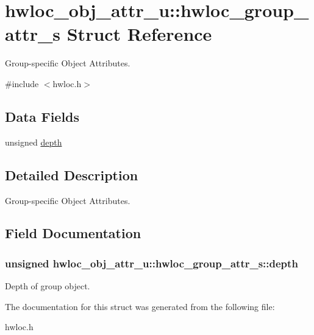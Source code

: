 \hypertarget{a00015}{
\section{hwloc\_\-obj\_\-attr\_\-u::hwloc\_\-group\_\-attr\_\-s Struct Reference}
\label{a00015}
}


Group-\/specific Object Attributes.  




{\ttfamily \#include $<$hwloc.h$>$}

\subsection*{Data Fields}
\begin{DoxyCompactItemize}
\item 
unsigned \hyperlink{a00015_ad914eac61c77481e1b7037877bcc5579}{depth}
\end{DoxyCompactItemize}


\subsection{Detailed Description}
Group-\/specific Object Attributes. 

\subsection{Field Documentation}
\hypertarget{a00015_ad914eac61c77481e1b7037877bcc5579}{
\subsubsection[{depth}]{\setlength{\rightskip}{0pt plus 5cm}unsigned {\bf hwloc\_\-obj\_\-attr\_\-u::hwloc\_\-group\_\-attr\_\-s::depth}}}
\label{a00015_ad914eac61c77481e1b7037877bcc5579}


Depth of group object. 



The documentation for this struct was generated from the following file:\begin{DoxyCompactItemize}
\item 
hwloc.h\end{DoxyCompactItemize}
